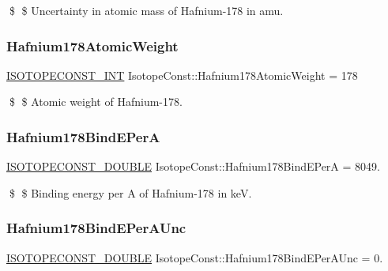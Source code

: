 \$ \$ Uncertainty in atomic mass of Hafnium-\/178 in amu. \mbox{\label{group___isotope_const-_hafnium-_hf178_gac784208b1e8191cd2b9f7fa2422bd791}} 
\subsubsection{\texorpdfstring{Hafnium178\+Atomic\+Weight}{Hafnium178AtomicWeight}}
{\footnotesize\ttfamily \mbox{\hyperlink{group___isotope_const-_macros_ga5f18360b3e99483a35c32d789e62621c}{I\+S\+O\+T\+O\+P\+E\+C\+O\+N\+S\+T\+\_\+\+I\+NT}} Isotope\+Const\+::\+Hafnium178\+Atomic\+Weight = 178}

\$ \$ Atomic weight of Hafnium-\/178. \mbox{\label{group___isotope_const-_hafnium-_hf178_ga1024cf0c6cba104abcbd2cc29c85244c}} 
\subsubsection{\texorpdfstring{Hafnium178\+Bind\+E\+PerA}{Hafnium178BindEPerA}}
{\footnotesize\ttfamily \mbox{\hyperlink{group___isotope_const-_macros_ga8f45a7272ce02c0b4c65c44636ed719a}{I\+S\+O\+T\+O\+P\+E\+C\+O\+N\+S\+T\+\_\+\+D\+O\+U\+B\+LE}} Isotope\+Const\+::\+Hafnium178\+Bind\+E\+PerA = 8049.}

\$ \$ Binding energy per A of Hafnium-\/178 in keV. \mbox{\label{group___isotope_const-_hafnium-_hf178_ga67c961a9f4abde030c264ddb7ced5bff}} 
\subsubsection{\texorpdfstring{Hafnium178\+Bind\+E\+Per\+A\+Unc}{Hafnium178BindEPerAUnc}}
{\footnotesize\ttfamily \mbox{\hyperlink{group___isotope_const-_macros_ga8f45a7272ce02c0b4c65c44636ed719a}{I\+S\+O\+T\+O\+P\+E\+C\+O\+N\+S\+T\+\_\+\+D\+O\+U\+B\+LE}} Isotope\+Const\+::\+Hafnium178\+Bind\+E\+Per\+A\+Unc = 0.}

